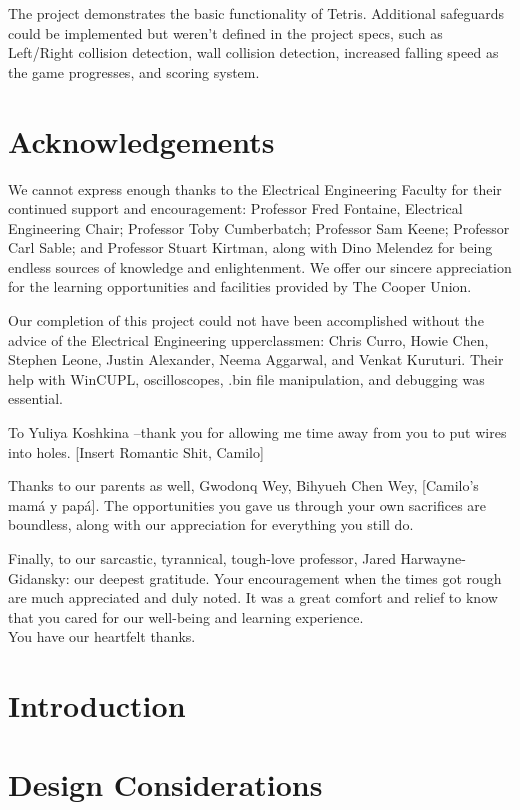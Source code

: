 \documentclass[letterpaper,titlepage,oneside]{article}
\begin{document}
The project demonstrates the basic functionality of Tetris. Additional safeguards could be implemented but weren't defined in the project specs, such as Left/Right collision detection, wall collision detection, increased falling speed as the game progresses, and scoring system.
\clearpage

\section*{Acknowledgements}
We cannot express enough thanks to the Electrical Engineering Faculty for their continued support and 
encouragement:  Professor Fred Fontaine, Electrical Engineering Chair; Professor Toby Cumberbatch; Professor Sam Keene; Professor Carl Sable; and Professor Stuart Kirtman, along with Dino Melendez for being endless sources of knowledge and enlightenment. We offer our sincere appreciation for the learning opportunities and facilities provided by The Cooper Union. 

Our completion of this project could not have been accomplished without the advice of the Electrical Engineering upperclassmen: Chris Curro, Howie Chen, Stephen Leone, Justin Alexander, Neema Aggarwal, and Venkat Kuruturi. Their help with WinCUPL, oscilloscopes, .bin file manipulation, and debugging was essential. 

To Yuliya Koshkina –thank you for allowing me time away from you to put wires into holes. [Insert Romantic Shit, Camilo]  

Thanks to our parents as well, Gwodonq Wey, Bihyueh Chen Wey, [Camilo's mam\'a y pap\'a]. The opportunities you gave us through your own sacrifices are boundless, along with our appreciation for everything you still do.

Finally, to our sarcastic, tyrannical, tough-love professor, Jared Harwayne-Gidansky: our deepest gratitude. Your encouragement when the times got rough are much appreciated and duly noted. It was a great comfort and relief to know that you cared for our well-being and learning experience. \\[5pt]
You have our heartfelt thanks.
\clearpage
\tableofcontents
\pagebreak
{}
\section{Introduction}

\clearpage
\section{Design Considerations}
\end{document}
